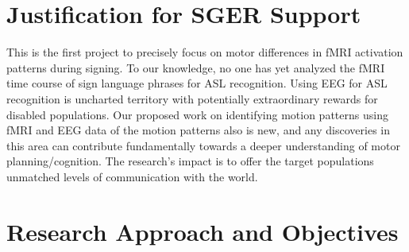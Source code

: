 \documentclass{proposal}
\begin{document}


\section{Justification for SGER Support}

This is the first project to precisely focus on motor differences in fMRI activation patterns during signing. To our knowledge, no one has yet analyzed the fMRI time course of sign language phrases for ASL recognition. Using EEG for ASL recognition is uncharted territory with potentially extraordinary rewards for disabled populations. Our proposed work on identifying motion patterns using fMRI and EEG data of the motion patterns also is new, and any discoveries in this area can contribute fundamentally towards a deeper understanding of motor planning/cognition. The research's impact is to offer the target populations unmatched levels of communication with the world.


\section{Research Approach and Objectives}
\end{document}

